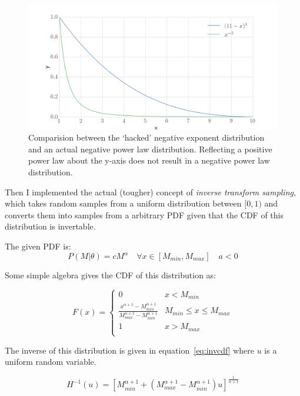 \documentclass[12pt,usletter,english]{article}
\begin{document}
\begin{figure}[!h]
  \centering \includegraphics[width=13cm]{wrong_scaling.png}
  \caption{Comparision between the `hacked' negative exponent
    distribution and an actual negative power law
    distribution. Reflecting a positive power law about the y-axis
    does not result in a negative power law distribution.
    \label{fig:wrong_scaling}}
\end{figure}

Then I implemented the actual (tougher) concept of \textit{inverse
  transform sampling}, which takes random samples from a uniform
distribution between $[0,1)$ and converts them into samples from a
arbitrary PDF given that the CDF of this distribution is invertable.

The given PDF is:
\begin{equation}
  \label{eq:powerlaw}
  P(M|\theta) = cM^{\alpha} \quad \forall x \in [M_{min},M_{max}] \quad a < 0
\end{equation}

Some simple algebra gives the CDF of this distribution as:

\begin{equation}
  F(x) =  \left\{
  \begin{array}{ll}
    0 & x < M_{min} \\[0.5cm] \frac{x^{\alpha+1}-
      M_{min}^{\alpha+1}}{M_{max}^{\alpha+1}- M_{min}^{\alpha+1}} &
    M_{min}\leq x\leq M_{max}\\[0.5cm] 1 & x > M_{max} \\
  \end{array}
  \right.
\end{equation}

The inverse of this distribution is given in equation~\ref{eq:invcdf}
where $u$ is a uniform random variable.

\begin{equation}
  \label{eq:invcdf}
  H^{-1}(u) = \left[ M_{min}^{\alpha+1} + \left(M_{max}^{\alpha+1} -
    M_{min}^{\alpha+1}\right)u\right]^{\frac{1}{\alpha+1}}
\end{equation}
\end{document}
